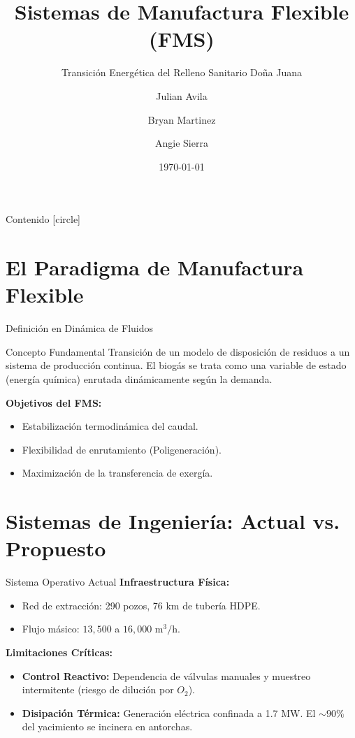 \documentclass[aspectratio=169,sn-mathphys-num,spanish]{beamer}
\title{Sistemas de Manufactura Flexible (FMS)}
\subtitle{Transición Energética del Relleno Sanitario Doña Juana}
\author{Julian Avila \and Bryan Martinez \and Angie Sierra}
\institute{
	Universidad Distrital Francisco José de Caldas \\
	Programa Académico de Física
}
\date{\today}
\begin{document}
\begin{frame}
	\titlepage
\end{frame}

\begin{frame}{Contenido}
	[circle]
	\tableofcontents
\end{frame}

\section{El Paradigma de Manufactura Flexible}

\begin{frame}{Definición en Dinámica de Fluidos}
	\begin{block}{Concepto Fundamental}
		Transición de un modelo de disposición de residuos a un sistema de
		producción continua. El biogás se trata como una variable de estado
		(energía química) enrutada dinámicamente según la demanda.
	\end{block}

	\vspace{0.5cm}
	\textbf{Objetivos del FMS:}
	\begin{itemize}
		\item Estabilización termodinámica del caudal.
		\item Flexibilidad de enrutamiento (Poligeneración).
		\item Maximización de la transferencia de exergía.
	\end{itemize}
\end{frame}

\section{Sistemas de Ingeniería: Actual vs. Propuesto}

\begin{frame}{Sistema Operativo Actual}
	\textbf{Infraestructura Física:}
	\begin{itemize}
		\item Red de extracción: 290 pozos, 76 km de tubería HDPE.
		\item Flujo másico: $13,500$ a $16,000 \text{ m}^3/\text{h}$.
	\end{itemize}

	\vspace{0.5cm}
	\textbf{Limitaciones Críticas:}
	\begin{itemize}
		\item \textbf{Control Reactivo:} Dependencia de válvulas manuales y
			muestreo intermitente (riesgo de dilución por $O_2$).
		\item \textbf{Disipación Térmica:} Generación eléctrica confinada a
			1.7 MW. El $\sim 90\%$ del yacimiento se incinera en antorchas.
	\end{itemize}
\end{frame}
\end{document}
